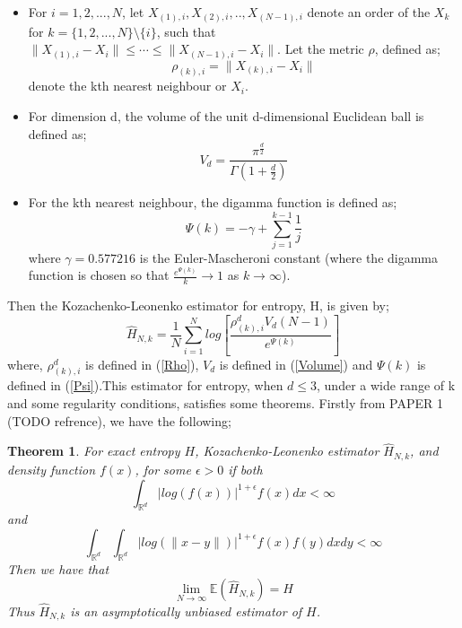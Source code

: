\documentclass{article}
\newtheorem{theorem}{Theorem}
\begin{document}
\begin{itemize}

\item For $i = 1, 2, ..., N$, let $X_{(1), i}, X_{(2), i}, .., X_{(N-1), i}$ denote an order of the $X_{k}$ for $k = \{1, 2, ..., N\} \setminus \{i\}$, such that $\| X_{(1), i} - X_{i}\| \leq \cdots \leq \|  X_{(N-1), i} - X_{i}\| $. Let the metric $\rho$, defined as;
\begin{equation} \label{Rho}
\rho_{(k), i} = \| X_{(k), i} - X_{i}\|
\end{equation} denote the kth nearest neighbour or $X_{i}$.

\item  For dimension d, the volume of the unit d-dimensional Euclidean ball is defined as;
\begin{equation} \label{Volume}
V_{d} = \frac{\pi^\frac{d}{2}}{\Gamma(1 + \frac{d}{2})}
\end{equation}

\item For the kth nearest neighbour, the digamma function is defined as;
\begin{equation} \label{Psi}
\Psi(k) = -\gamma + \sum_{j=1}^{k-1} \frac{1}{j}
\end{equation}
where $\gamma = 0.577216$ is the Euler-Mascheroni constant (where the digamma function is chosen so that $\frac{e^{\Psi(k)}}{k}\to1$ as $k \to \infty$).

\end{itemize} Then the Kozachenko-Leonenko estimator for entropy, H, is given by;
\begin{equation} \label{KLest}
\hat{H}_{N, k} = \frac{1}{N} \sum_{i=1}^{N} log \left[ \frac{\rho_{(k),i}^{d} V_{d} (N-1)}{e^{\Psi(k)}} \right]
\end{equation} where, $\rho_{(k),i}^{d}$ is defined in (\ref{Rho}), $V_{d}$ is defined in (\ref{Volume}) and $\Psi(k)$ is defined in (\ref{Psi}).This estimator for entropy, when $d \leq 3$, under a wide range of k and some regularity conditions, satisfies some  theorems. Firstly from PAPER 1 (TODO refrence), we have the following;

\begin{theorem} \label{paper1_T1}
For exact entropy $H$, Kozachenko-Leonenko estimator $\hat{H}_{N,k}$, and density function $f(x)$, for some $\epsilon > 0$ if both
\begin{equation} \label{paper1_T1_eq1}
\int_{\mathbb{R}^{d}} | log(f(x))|^{1 + \epsilon} f(x) dx < \infty 
\end{equation}
and
\begin{equation} \label{paper1_T1_eq2}
\int_{\mathbb{R}^{d}} \int_{\mathbb{R}^{d}} | log(\|x-y\|)|^{1+ \epsilon} f(x) f(y) dx dy < \infty
\end{equation}
Then we have that 
\begin{equation} 
\lim_{N \to \infty} \mathbb{E} (\hat{H}_{N, k}) = H \nonumber
\end{equation}
Thus $\hat{H}_{N, k}$ is an asymptotically unbiased estimator of $H$.
\end{theorem}
\end{document}
